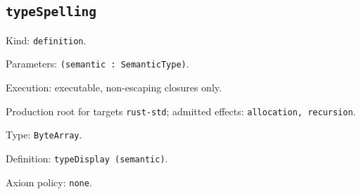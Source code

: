 \documentclass[11pt]{article}
\begin{document}
\subsection*{\texttt{typeSpelling}}
\noindent Kind: \texttt{definition}.\par
\noindent Parameters: \texttt{(semantic : SemanticType)}.\par
\noindent Execution: executable, non-escaping closures only.\par
\noindent Production root for targets \texttt{rust-std}; admitted effects: \texttt{allocation, recursion}.\par
\noindent Type: \texttt{ByteArray}.\par
\noindent Definition: \texttt{typeDisplay (semantic)}.\par
\noindent Axiom policy: \texttt{none}.\par
\end{document}

